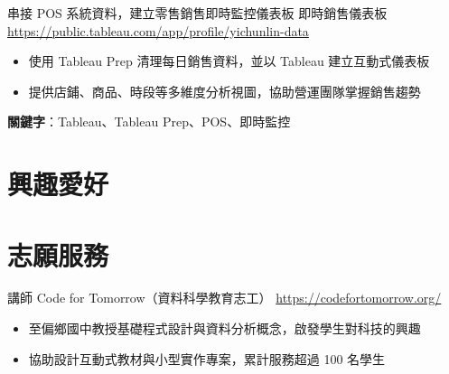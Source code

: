 \documentclass[a4paper, serif, 10pt]{moderncv}
\begin{document}
        {串接 POS 系統資料，建立零售銷售即時監控儀表板}
        {即時銷售儀表板}
        {\url{https://public.tableau.com/app/profile/yichunlin-data}}
        {}
        {\begin{itemize}
\item 使用 Tableau Prep 清理每日銷售資料，並以 Tableau 建立互動式儀表板
\item 提供店鋪、商品、時段等多維度分析視圖，協助營運團隊掌握銷售趨勢
\end{itemize}
\textbf{關鍵字}：Tableau、Tableau Prep、POS、即時監控}
\section{興趣愛好}

\section{志願服務}

        {講師}
        {Code for Tomorrow（資料科學教育志工）}
        {\url{https://codefortomorrow.org/}}
        {}
        {\begin{itemize}
\item 至偏鄉國中教授基礎程式設計與資料分析概念，啟發學生對科技的興趣
\item 協助設計互動式教材與小型實作專案，累計服務超過 100 名學生
\end{itemize}}
    
\end{document}
